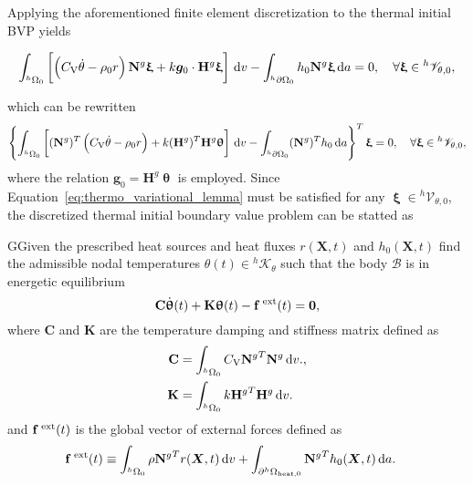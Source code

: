 Applying the aforementioned finite element discretization to the  thermal initial BVP yields
\begin{highlight}
\begin{equation}
  \int_{^h\Omega_0}   \left[\left(C_\mathrm{V} \dot \theta - \rho_0 r\right)  \mathbf N^g\bm \upxi +k\bm g_0\cdot \mathbf H^g \bm \upxi\right]\,\mathrm{d} v - \int_{^h\partial\Omega_0} h_0 \mathbf N^g\bm \upxi\,\mathrm{d} a = 0,\quad \forall \bm \upxi \in {}^h\mathscr{V}_{\theta,0},
\end{equation}
\end{highlight}
which can be rewritten
\begin{equation} \label{eq:thermo_variational_lemma}
  \left\{\int_{^h\Omega_0}   \left[(\mathbf N^g)^T\left(C_\mathrm{V} \dot \theta - \rho_0 r\right) +k(\mathbf H^g)^T\mathbf H^g \bm \uptheta \right]\,\mathrm{d} v - \int_{^h\partial\Omega_0} (\mathbf N^g)^T h_0 \,\mathrm{d} a \right\}^T\bm \upxi= 0,\quad \forall \bm \upxi \in {}^h\mathscr{V}_{\theta,0},
\end{equation}
where the relation \(\bm g_0 = \mathbf H^g \bm \uptheta\) is employed.
Since Equation~\eqref{eq:thermo_variational_lemma} must be satisfied for any \(\bm \upxi\in {}^h\mathscr V_{\theta,0}\), the discretized  thermal initial boundary value problem can be statted as
\begin{problem}
GGiven the prescribed heat sources and heat fluxes $r(\bm X, t)$ and $h_0(\bm X, t)$ find the admissible nodal temperatures $\theta(t)\in {^h\mathscr{K}_{\theta}}$ such that the body $\mathscr{B}$ is in energetic equilibrium
\begin{equation}
    \mathbf C \dot{ \bm\uptheta}(t) +\mathbf K\bm\uptheta(t)-\mathbf f^\text{\;ext}(t)=\mathbf 0, \label{eq:equilibrium_material}
\end{equation}
where $\mathbf C$ and \(\mathbf K\) are the temperature damping and stiffness matrix defined as
\begin{align}
  \mathbf C &= \int_{{}^h\Omega_0} C_\mathrm{V} {\mathbf{N}^g}^T \mathbf{N}^g \,\mathrm{d} v.,\\
  \mathbf K &= \int_{{}^h\Omega_0} k {\mathbf{H}^g}^T\mathbf{H}^g \,\mathrm{d} v.
\end{align}
and $\mathbf f^\text{\;ext}(t)$ is the global vector of external forces defined as
\begin{align}
    \mathbf f^\text{\;ext}(t) &\equiv \int_{^h\Omega_0} \rho{\mathbf N^g}^T r(\bm X, t)\,\mathrm{d} v + \int_{\partial^h\Omega_\text{heat,0}}{\mathbf N^g}^T h_0(\bm X, t)\,\mathrm{d} a.
\end{align}
\end{problem}
